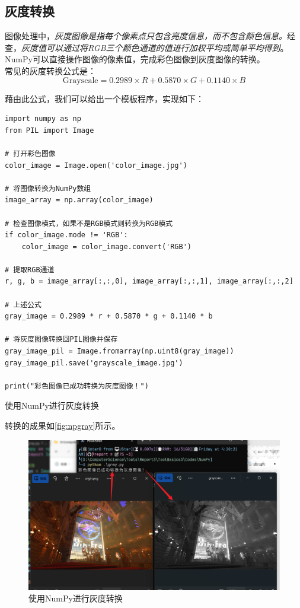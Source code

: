 \subsection{灰度转换}

图像处理中，\textit{灰度图像是指每个像素点只包含亮度信息，而不包含颜色信息。}经查，\textit{灰度值可以通过将RGB三个颜色通道的值进行加权平均或简单平均得到}。NumPy可以直接操作图像的像素值，完成彩色图像到灰度图像的转换。\\

常见的灰度转换公式是：
\[
\text{Grayscale} = 0.2989 \times R + 0.5870 \times G + 0.1140 \times B
\]

藉由此公式，我们可以给出一个模板程序，实现如下：

\begin{longlisting}
    \begin{verbatim}
import numpy as np
from PIL import Image

# 打开彩色图像
color_image = Image.open('color_image.jpg')

# 将图像转换为NumPy数组
image_array = np.array(color_image)

# 检查图像模式，如果不是RGB模式则转换为RGB模式
if color_image.mode != 'RGB':
    color_image = color_image.convert('RGB')

# 提取RGB通道
r, g, b = image_array[:,:,0], image_array[:,:,1], image_array[:,:,2]

# 上述公式
gray_image = 0.2989 * r + 0.5870 * g + 0.1140 * b

# 将灰度图像转换回PIL图像并保存
gray_image_pil = Image.fromarray(np.uint8(gray_image))
gray_image_pil.save('grayscale_image.jpg')

print("彩色图像已成功转换为灰度图像！")
    \end{verbatim}
    \caption{使用NumPy进行灰度转换}
    \label{listing:npgray}
\end{longlisting}

转换的成果如\autoref{fig:npgray}所示。

\begin{figure}[!h]
    \centering
    \includegraphics[width=.8\textwidth]{./Figures/N1.png}
    \caption{使用NumPy进行灰度转换}
    \label{fig:npgray}
\end{figure}

